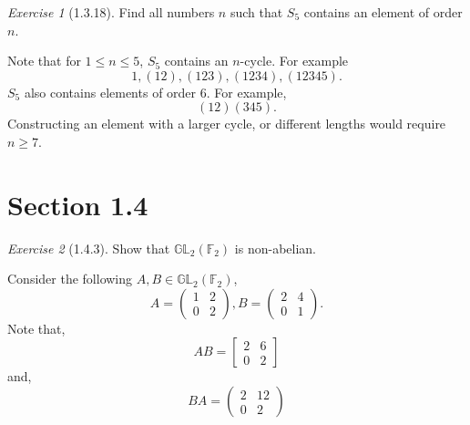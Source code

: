 \documentclass[12pt]{amsart}
\makeatletter
\theoremstyle{remark}
\newtheorem*{exercise}{Exercise}%
\renewenvironment{proof}[1][\proofname]{\par\doublespacing
  \pushQED{\qed}%
  \normalfont \topsep6\p@\@plus6\p@\relax
  \list{}{%
    \settowidth{\leftmargin}{\itshape\proofname:\hskip\labelsep}%
    \setlength{\labelwidth}{0pt}%
    \setlength{\itemindent}{-\leftmargin}%
  }%
  \item[\hskip\labelsep\itshape#1\@addpunct{:}]\ignorespaces
}{%
  \popQED\endlist\@endpefalse
  \singlespacing
}
\theoremstyle{mycomment}
\makeatother
\begin{document}
\begin{exercise}[1.3.18] Find all numbers $n$ such that $S_5$ contains an element of order $n$. 
  \begin{proof}[Solution] Note that for $1 \leq n \leq 5$, $S_5$ contains an $n$-cycle. For example
    \begin{equation*}
      1, (12), (123), (1234), (12345).
    \end{equation*}
    $S_5$ also contains elements of order $6$. For example,
    \begin{equation*}
      (12)(345).
    \end{equation*}
    Constructing an element with a larger cycle, or different lengths would require $n \geq 7$.
  \end{proof}  
\end{exercise}

\section*{\textbf{Section 1.4}}
\begin{exercise}[1.4.3] Show that $\mathbb{G}\mathbb{L}_2(\mathbb{F}_2)$ is non-abelian.
  \begin{proof}
    Consider the following $A, B \in \mathbb{G}\mathbb{L}_2(\mathbb{F}_2)$,
    \begin{equation*}
      A = \begin{pmatrix}
        1 & 2\\
        0 & 2
      \end{pmatrix}
      , 
      B = \begin{pmatrix}
        2 & 4\\
        0 & 1
      \end{pmatrix}.
    \end{equation*}
    Note that,
    \begin{equation*}
      AB = 
      \begin{bmatrix}2&6\\ 0&2\end{bmatrix}
    \end{equation*}
    and,
    \begin{equation*}
    BA = \begin{pmatrix}2&12\\ 0&2\end{pmatrix}
    \end{equation*}
  \end{proof}
\end{exercise}
\end{document}
